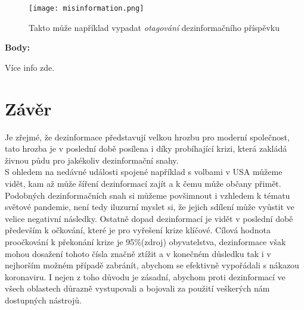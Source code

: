 
\begin{figure}[htbp]
  \centering
  \texttt{[image: misinformation.png]}
  \caption{Takto může například vypadat \textit{otagování} dezinformačního příspěvku\cite{}}
  \label{fig:disputed_claim}
\end{figure}

\textbf{Body:}

Více info zde\cite{}.

\newpage

\section{Závěr}

Je zřejmé, že dezinformace představují velkou hrozbu pro moderní společnost, tato hrozba je v poslední době posílena i díky probíhající krizi, která zakládá živnou půdu pro jakékoliv dezinformační snahy.\\

S ohledem na nedávné události spojené například s volbami v USA můžeme vidět, kam až může šíření dezinformací zajít a k čemu může občany přimět.\\

Podobných dezinformačních snah si můžeme povšimnout i vzhledem k tématu světové pandemie, není tedy iluzurní myslet si, že jejich sdílení může vyůstit ve velice negativní následky. Ostatně dopad dezinformací je vidět v poslední době především k očkování, které je pro vyřešení krize klíčové. Cílová hodnota proočkování k překonání krize je 95\%(zdroj) obyvatelstva, dezinformace však mohou dosažení tohoto čísla značně ztížit a v konečném důsledku tak i v nejhorším možném případě zabránít, abychom se efektivně vypořádali s nákazou koronaviru. I nejen z toho důvodu je zásadní, abychom proti dezinformací ve všech oblastech důrazně vystupovali a bojovali za použití veškerých nám dostupných nástrojů.\\

